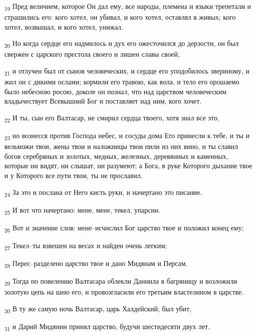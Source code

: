 \begin{tcolorbox}
\textsubscript{19} Пред величием, которое Он дал ему, все народы, племена и языки трепетали и страшились его: кого хотел, он убивал, и кого хотел, оставлял в живых; кого хотел, возвышал, и кого хотел, унижал.
\end{tcolorbox}
\begin{tcolorbox}
\textsubscript{20} Но когда сердце его надмилось и дух его ожесточился до дерзости, он был свержен с царского престола своего и лишен славы своей,
\end{tcolorbox}
\begin{tcolorbox}
\textsubscript{21} и отлучен был от сынов человеческих, и сердце его уподобилось звериному, и жил он с дикими ослами; кормили его травою, как вола, и тело его орошаемо было небесною росою, доколе он познал, что над царством человеческим владычествует Всевышний Бог и поставляет над ним, кого хочет.
\end{tcolorbox}
\begin{tcolorbox}
\textsubscript{22} И ты, сын его Валтасар, не смирил сердца твоего, хотя знал все это,
\end{tcolorbox}
\begin{tcolorbox}
\textsubscript{23} но вознесся против Господа небес, и сосуды дома Его принесли к тебе, и ты и вельможи твои, жены твои и наложницы твои пили из них вино, и ты славил богов серебряных и золотых, медных, железных, деревянных и каменных, которые ни видят, ни слышат, ни разумеют; а Бога, в руке Которого дыхание твое и у Которого все пути твои, ты не прославил.
\end{tcolorbox}
\begin{tcolorbox}
\textsubscript{24} За это и послана от Него кисть руки, и начертано это писание.
\end{tcolorbox}
\begin{tcolorbox}
\textsubscript{25} И вот что начертано: мене, мене, текел, упарсин.
\end{tcolorbox}
\begin{tcolorbox}
\textsubscript{26} Вот и значение слов: мене--исчислил Бог царство твое и положил конец ему;
\end{tcolorbox}
\begin{tcolorbox}
\textsubscript{27} Текел--ты взвешен на весах и найден очень легким;
\end{tcolorbox}
\begin{tcolorbox}
\textsubscript{28} Перес--разделено царство твое и дано Мидянам и Персам.
\end{tcolorbox}
\begin{tcolorbox}
\textsubscript{29} Тогда по повелению Валтасара облекли Даниила в багряницу и возложили золотую цепь на шею его, и провозгласили его третьим властелином в царстве.
\end{tcolorbox}
\begin{tcolorbox}
\textsubscript{30} В ту же самую ночь Валтасар, царь Халдейский, был убит,
\end{tcolorbox}
\begin{tcolorbox}
\textsubscript{31} и Дарий Мидянин принял царство, будучи шестидесяти двух лет.
\end{tcolorbox}
